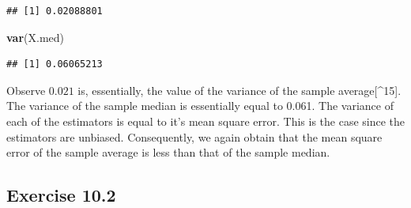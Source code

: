 \documentclass[
]{krantz}
\makeatletter
\newenvironment{Shaded}{\begin{snugshade}}{\end{snugshade}}
\newcommand{\KeywordTok}[1]{\textcolor[rgb]{0.13,0.29,0.53}{\textbf{#1}}}
\newcommand{\NormalTok}[1]{#1}
\newenvironment{kframe}{%
\medskip{}
\setlength{\fboxsep}{.8em}
 \def\at@end@of@kframe{}%
 \ifinner\ifhmode%
  \def\at@end@of@kframe{\end{minipage}}%
  \begin{minipage}{\columnwidth}%
 \fi\fi%
 \def\FrameCommand##1{\hskip\@totalleftmargin \hskip-\fboxsep
 \colorbox{shadecolor}{##1}\hskip-\fboxsep
     \hskip-\linewidth \hskip-\@totalleftmargin \hskip\columnwidth}%
 \MakeFramed {\advance\hsize-\width
   \@totalleftmargin\z@ \linewidth\hsize
   \@setminipage}}%
 {\par\unskip\endMakeFramed%
 \at@end@of@kframe}
\renewenvironment{Shaded}{\begin{kframe}}{\end{kframe}}
\theoremstyle{definition}
\theoremstyle{definition}
\theoremstyle{definition}
\theoremstyle{remark}
\makeatother
\begin{document}
\begin{enumerate}
\begin{verbatim}
## [1] 0.02088801
\end{verbatim}

\begin{Shaded}
\begin{Highlighting}[]
\KeywordTok{var}\NormalTok{(X.med)}
\end{Highlighting}
\end{Shaded}

\begin{verbatim}
## [1] 0.06065213
\end{verbatim}

  Observe \(0.021\) is, essentially, the value of the variance of the sample
  average{[}\^{}15{]}. The variance of the sample median is essentially equal to
  0.061. The variance of each of the estimators is equal to it's mean
  square error. This is the case since the estimators are unbiased.
  Consequently, we again obtain that the mean square error of the sample
  average is less than that of the sample median.
\end{enumerate}

\hypertarget{exercise-10.2}{%
\subsection*{Exercise 10.2}\label{exercise-10.2}}
\end{document}
